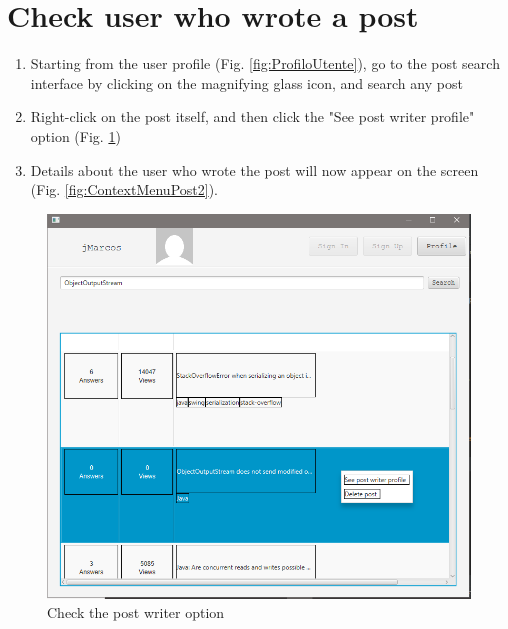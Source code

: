 \documentclass[11pt]{report}
\begin{document}
\section{Check user who wrote a post}
\begin{enumerate}
    \item Starting from the user profile (Fig. \ref{fig:ProfiloUtente}), go to the post search interface by clicking on the magnifying glass icon, and search any post
    \item Right-click on the post itself, and then click the "See post writer profile" option (Fig. \ref{fig:ContextMenuPost1})
    \item Details about the user who wrote the post will now appear on the screen (Fig. \ref{fig:ContextMenuPost2}).
\end{enumerate}
\begin{figure}[H]
  \centering
  \includegraphics[width=\textwidth,keepaspectratio=true]{img/user_manual/ContextMenuPost1.png}
  \caption{Check the post writer option}
  \label{fig:ContextMenuPost1}
\end{figure}
\end{document}
